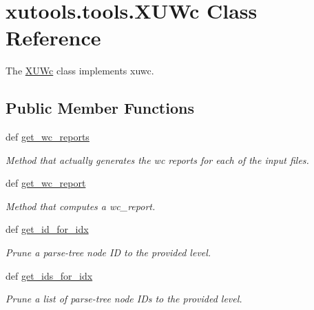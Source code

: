 \hypertarget{classxutools_1_1tools_1_1_x_u_wc}{\section{xutools.\-tools.\-X\-U\-Wc Class Reference}
\label{classxutools_1_1tools_1_1_x_u_wc}
}


The \hyperlink{classxutools_1_1tools_1_1_x_u_wc}{X\-U\-Wc} class implements xuwc.  


\subsection*{Public Member Functions}
\begin{DoxyCompactItemize}
\item 
def \hyperlink{classxutools_1_1tools_1_1_x_u_wc_abaeb2b91ed4883dd1bbe5107a01f8eda}{get\-\_\-wc\-\_\-reports}
\begin{DoxyCompactList}\small\item\em Method that actually generates the wc reports for each of the input files. \end{DoxyCompactList}\item 
def \hyperlink{classxutools_1_1tools_1_1_x_u_wc_a34c28d8a85bab7fa6ab12d9358082801}{get\-\_\-wc\-\_\-report}
\begin{DoxyCompactList}\small\item\em Method that computes a wc\-\_\-report. \end{DoxyCompactList}\item 
def \hyperlink{classxutools_1_1tools_1_1_x_u_wc_a83fc9c63d281459cb97450b360db5c3a}{get\-\_\-id\-\_\-for\-\_\-idx}
\begin{DoxyCompactList}\small\item\em Prune a parse-\/tree node I\-D to the provided level. \end{DoxyCompactList}\item 
def \hyperlink{classxutools_1_1tools_1_1_x_u_wc_a596b4d12127fd352732b1ff1d8f8141e}{get\-\_\-ids\-\_\-for\-\_\-idx}
\begin{DoxyCompactList}\small\item\em Prune a list of parse-\/tree node I\-Ds to the provided level. \end{DoxyCompactList}\end{DoxyCompactItemize}
